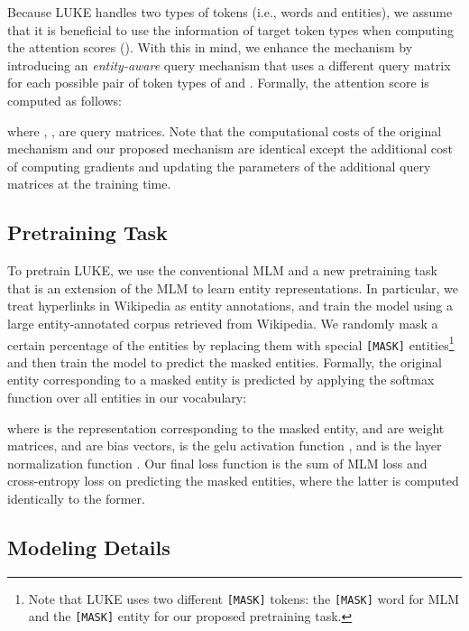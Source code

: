 \documentclass[11pt,a4paper]{article}
\begin{document}
Because LUKE handles two types of tokens (i.e., words and entities), we assume that it is beneficial to use the information of target token types when computing the attention scores ().
With this in mind, we enhance the mechanism by introducing an \textit{entity-aware} query mechanism that uses a different query matrix for each possible pair of token types of  and .
Formally, the attention score  is computed as follows:

where , ,  are query matrices.
Note that the computational costs of the original mechanism and our proposed mechanism are identical except the additional cost of computing gradients and updating the parameters of the additional query matrices at the training time.

\subsection{Pretraining Task}
\label{subsec:pretraining}

To pretrain LUKE, we use the conventional MLM and a new pretraining task that is an extension of the MLM to learn entity representations.
In particular, we treat hyperlinks in Wikipedia as entity annotations, and train the model using a large entity-annotated corpus retrieved from Wikipedia.
We randomly mask a certain percentage of the entities by replacing them with special \texttt{[MASK]} entities\footnote{Note that LUKE uses two different \texttt{[MASK]} tokens: the \texttt{[MASK]} word for MLM and the \texttt{[MASK]} entity for our proposed pretraining task.} and then train the model to predict the masked entities.
Formally, the original entity corresponding to a masked entity is predicted by applying the softmax function over all entities in our vocabulary:

where  is the representation corresponding to the masked entity,  and  are weight matrices,  and  are bias vectors,  is the gelu activation function \cite{hendrycks2016gaussian}, and  is the layer normalization function \cite{lei2016layer}.
Our final loss function is the sum of MLM loss and cross-entropy loss on predicting the masked entities, where the latter is computed identically to the former.

\subsection{Modeling Details}
\label{subsec:modelling-details}
\end{document}

